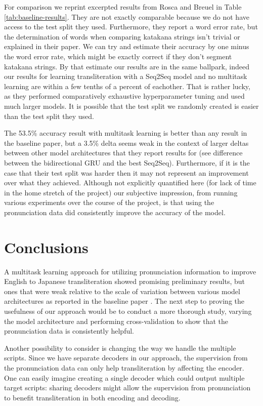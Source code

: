 \documentclass{article}
\begin{document}
For comparison we reprint excerpted results
from Rosca and Breuel \cite{Rosca2016SequencetosequenceNN}
in Table \ref{tab:baseline-results}.
They are not exactly comparable
because we do not have access to the test split they used.
Furthermore,
they report a word error rate,
but the determination of words when comparing katakana strings
isn't trivial or explained in their paper.
We can try and estimate their accuracy
by one minus the word error rate,
which might be exactly correct if they don't segment katakana strings.
By that estimate our results are in the same ballpark,
indeed our results for learning transliteration
with a Seq2Seq model and no multitask learning
are within a few tenths of a percent of eachother.
That is rather lucky,
as they performed comparatively exhaustive hyperparameter tuning
and used much larger models.
It is possible that the test split we randomly created
is easier than the test split they used.

The 53.5\% accuracy result with multitask learning
is better than any result in the baseline paper,
but a 3.5\% delta seems weak
in the context of larger deltas between other model architectures
that they report results for
(see difference between the bidirectional GRU and the best Seq2Seq).
Furthermore,
if it is the case that their test split was harder
then it may not represent an improvement over what they achieved.
Although not explicitly quantified here
(for lack of time in the home stretch of the project)
our subjective impression,
from running various experiments over the course of the project,
is that using the pronunciation data
did consistently improve the accuracy of the model.

\section*{Conclusions}

A multitask learning approach for utilizing pronunciation information
to improve English to Japanese transliteration
showed promising preliminary results,
but ones that were weak relative to the scale of variation
between various model architectures as reported
in the baseline paper \cite{Rosca2016SequencetosequenceNN}.
The next step to proving the usefulness of our approach
would be to conduct a more thorough study,
varying the model architecture and performing cross-validation
to show that the pronunciation data is consistently helpful.

Another possibility to consider
is changing the way we handle the multiple scripts.
Since we have separate decoders in our approach,
the supervision from the pronunciation data
can only help transliteration by affecting the encoder.
One can easily imagine creating a single decoder
which could output multiple target scripts:
sharing decoders might allow the supervision from pronunciation
to benefit transliteration in both encoding and decoding.
\end{document}
